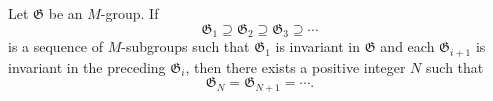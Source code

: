 Let $\mathfrak{G}$ be an $M$-group. If
\[
\mathfrak{G}_1 \supseteq \mathfrak{G}_2 \supseteq \mathfrak{G}_3 \supseteq \cdots
\]
is a sequence of $M$-subgroups such that $\mathfrak{G}_1$ is invariant in $\mathfrak{G}$ and each $\mathfrak{G}_{i+1}$ is invariant in the preceding $\mathfrak{G}_i$, then there exists a positive integer $N$ such that
\[
\mathfrak{G}_N = \mathfrak{G}_{N+1} = \cdots.
\]
